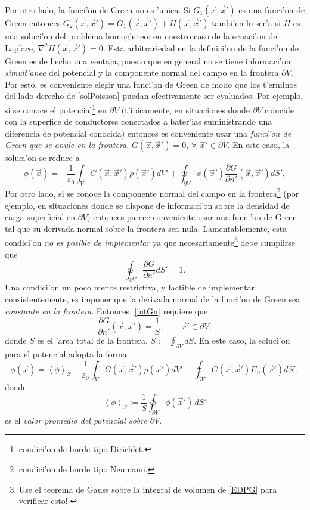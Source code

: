 Por otro lado, la funci'on de Green no es 'unica. Si $G_1(\vec{x},\vec{x}')$ es una funci'on de Green entonces $G_2(\vec{x},\vec{x}')=G_1(\vec{x},\vec{x}')+H(\vec{x},\vec{x}')$ tambi'en lo ser'a si $H$ es una soluci'on del problema homog'eneo: en nuestro caso de la ecuaci'on de Laplace, $\nabla^2H(\vec{x},\vec{x}')=0$. Esta arbitrariedad en la definici'on de la funci'on de Green es de hecho una ventaja, puesto que en general no se tiene informaci'on \textit{simult'anea} del potencial y la componente normal del campo en la frontera $\partial V$. Por esto, es conveniente elegir una funci'on de Green de modo que los t'erminos del lado derecho de \eqref{solPoisson} puedan efectivamente ser evaluados. Por ejemplo, si se conoce el potencial\footnote{condici'on de borde tipo Dirichlet.} en $\partial V$ (t'ipicamente, en situaciones donde $\partial V$ coincide con la superfice de conductores conectados a bater'ias suministrando una diferencia de potencial conocida) entonces es conveniente usar una \textit{funci'on de Green que se anule en la frontera}, $G(\vec{x},\vec{x}')=0$, $\forall$ $\vec{x}'\in\partial V$. En este caso, la soluci'on se reduce a
\begin{equation}\label{solPoissonDirichlet}
\phi(\vec{x})= -\frac{1}{\varepsilon_0}\int_VG(\vec{x},\vec{x}') \rho(\vec{x}')dV'+\oint_{\partial V}\phi(\vec{x}')\frac{\partial G}{\partial n'}(\vec{x},\vec{x}')dS',
\end{equation}
 Por otro lado, si se conoce la componente normal del campo en la frontera\footnote{condici'on de borde tipo Neumann.} (por ejemplo, en situaciones donde se dispone de informaci'on sobre la densidad de carga superficial en $\partial V$) entonces parece conveniente usar una funci'on de Green tal que su derivada normal sobre la frontera sea nula. Lamentablemente, esta condici'on \textit{no es posible de implementar} ya que necesariamente\footnote{Use el teorema de Gauss sobre la integral de volumen de \eqref{EDPG} para verificar esto!.} debe cumplirse que
\begin{equation}\label{intGn}
\oint_{\partial V}\frac{\partial G}{\partial n'}dS'=1.
\end{equation}
Una condici'on un poco menos restrictiva, y factible de implementar consistentemente, es imponer que la derivada normal de la funci'on de Green sea \textit{constante en la frontera}. Entonces, \eqref{intGn} requiere que
\begin{equation}
\frac{\partial G}{\partial n'}(\vec{x},\vec{x}')=\frac{1}{S}, \qquad \vec{x}'\in\partial V,
\end{equation}
donde $S$ es el 'area total de la frontera, $S:=\oint_{\partial V} dS$. En este caso, la soluci'on para el potencial adopta la forma
\begin{equation}
\phi(\vec{x})= \left\langle\phi\right\rangle_S-\frac{1}{\varepsilon_0}\int_VG(\vec{x},\vec{x}') \rho(\vec{x}')dV'+\oint_{\partial V}G(\vec{x},\vec{x}')E_n(\vec{x}')dS',
\end{equation}
donde
\begin{equation}
\left\langle\phi\right\rangle_S:=\frac{1}{S}\oint_{\partial V}\phi(\vec{x}')\,dS'
\end{equation}
es el \textit{valor promedio del potencial sobre} $\partial V$.


